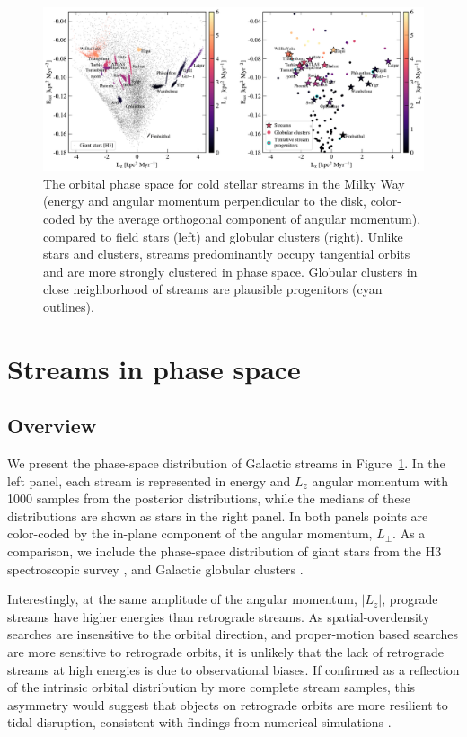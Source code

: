\documentclass[twocolumn]{aastex63}
\begin{document}
\begin{figure}
\begin{center}
\includegraphics[width=\textwidth]{elz_streams.pdf}
\end{center}
\caption{The orbital phase space for cold stellar streams in the Milky Way (energy and angular momentum perpendicular to the disk, color-coded by the average orthogonal component of angular momentum), compared to field stars (left) and globular clusters (right).
Unlike stars and clusters, streams predominantly occupy tangential orbits and are more strongly clustered in phase space.
Globular clusters in close neighborhood of streams are plausible progenitors (cyan outlines).
}
\label{fig:elz}
\end{figure}

\section{Streams in phase space}
\label{sec:phasespace}

\subsection{Overview}
\label{sec:elz}

We present the phase-space distribution of Galactic streams in Figure~\ref{fig:elz}.
In the left panel, each stream is represented in energy and $L_z$ angular momentum with 1000 samples from the posterior distributions, while the medians of these distributions are shown as stars in the right panel.
In both panels points are color-coded by the in-plane component of the angular momentum, $L_\perp$.
As a comparison, we include the phase-space distribution of giant stars from the H3 spectroscopic survey \citep[left panel, small black points;][]{conroy2019}, and Galactic globular clusters \citep[righ panel, small circles colored by $L_\perp$;][]{baumgardt2019}.

Interestingly, at the same amplitude of the angular momentum, $|L_z|$, prograde streams have higher energies than retrograde streams.
As spatial-overdensity searches are insensitive to the orbital direction, and proper-motion based searches are more sensitive to retrograde orbits, it is unlikely that the lack of retrograde streams at high energies is due to observational biases.
If confirmed as a reflection of the intrinsic orbital distribution by more complete stream samples, this asymmetry would suggest that objects on retrograde orbits are more resilient to tidal disruption, consistent with findings from numerical simulations \citep[e.g.,][]{find}.
\end{document}
